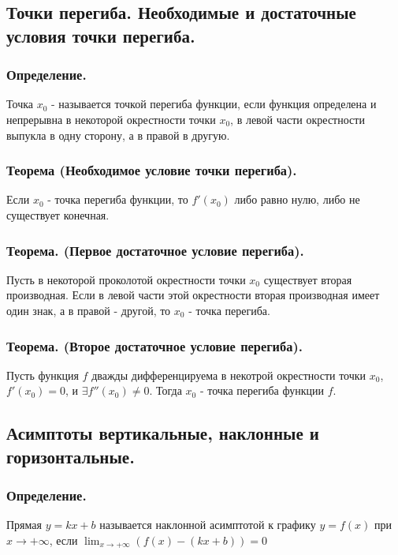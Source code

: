 \documentclass[a4paper,12pt]{article}
\theoremstyle{plain} %
\theoremstyle{definition} %
\theoremstyle{remark} %
\begin{document}
\newpage
\subsection*{Точки перегиба. Необходимые и достаточные условия точки перегиба.                                        }

\subsubsection*{Определение.}
Точка $x_0$ - называется точкой перегиба функции, если функция определена и непрерывна в некоторой окрестности точки $x_0$, в левой части окрестности выпукла в одну сторону, а в правой в другую.

\subsubsection*{Теорема (Необходимое условие точки перегиба).}
Если $x_0$ - точка перегиба функции, то $f'(x_0)$ либо равно нулю, либо не существует конечная.

\subsubsection*{Теорема. (Первое достаточное условие перегиба).}
Пусть в некоторой проколотой окрестности точки $x_0$ существует вторая производная. Если в левой части этой окрестности вторая производная имеет один знак, а в правой - другой, то $x_0$ - точка перегиба.

\subsubsection*{Теорема. (Второе достаточное условие перегиба).}
Пусть функция $f$ дважды дифференцируема в некотрой окрестности точки $x_0$, $f'(x_0) = 0$, и $\exists f''(x_0) \neq 0$. Тогда $x_0$ - точка перегиба функции $f$.

\newpage
\subsection*{Асимптоты вертикальные, наклонные и горизонтальные.                                                      }
\subsubsection*{Определение.}
Прямая $y = kx + b$ называется наклонной асимптотой к графику $y = f(x)$ при $x \rightarrow +\infty$, если $\lim_{x \rightarrow +\infty}(f(x) - (kx + b)) = 0$
\end{document}
